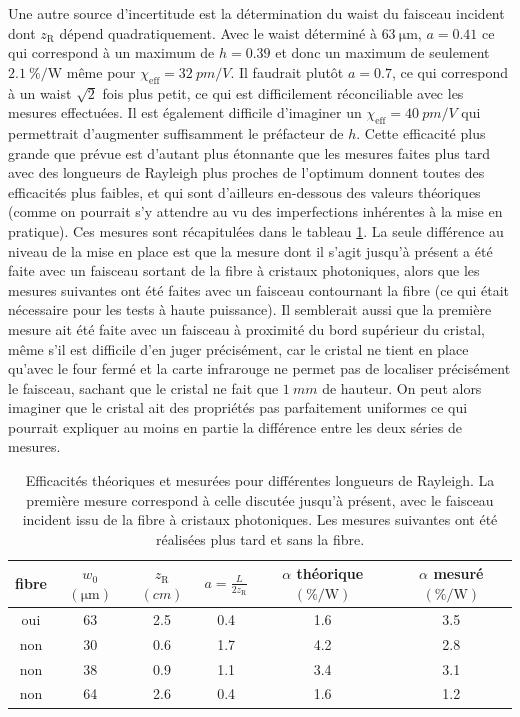 \documentclass[11pt,a4paper]{article}
\newcommand{\ra}[1]{\renewcommand{\arraystretch}{#1}}
\newcommand{\zr}{z_\mathsc{R}}
\newcommand{\chie}{\chi_\mathsc{eff}}
\newcommand{\alphae}[1]{\SI{#1}{\percent\per\watt}}
\newcommand{\mathsc}[1]{\mathrm{\scriptscriptstyle {#1}}}
\begin{document}
Une autre source d'incertitude est la détermination du waist du faisceau incident dont $\zr$ dépend quadratiquement. Avec le waist déterminé à $\SI{63}{\micro\meter}$, $a=0.41$ ce qui correspond à un maximum de $h = 0.39$ et donc un maximum de seulement $\alphae{2.1}$ même pour $\chie = \SI{32}{pm/V}$. Il faudrait plutôt $a=0.7$, ce qui correspond à un waist $\sqrt2$ fois plus petit, ce qui est difficilement réconciliable avec les mesures effectuées. %
Il est également difficile d'imaginer un $\chie=\SI{40}{pm/V}$ qui permettrait d'augmenter suffisamment le préfacteur de $h$. Cette efficacité plus grande que prévue est d'autant plus étonnante que les mesures faites plus tard avec des longueurs de Rayleigh plus proches de l'optimum donnent toutes des efficacités plus faibles, et qui sont d'ailleurs en-dessous des valeurs théoriques (comme on pourrait s'y attendre au vu des imperfections inhérentes à la mise en pratique). Ces mesures sont récapitulées dans le tableau \ref{table:bp}. La seule différence au niveau de la mise en place est que la mesure dont il s'agit jusqu'à présent a été faite avec un faisceau sortant de la fibre à cristaux photoniques, alors que les mesures suivantes ont été faites avec un faisceau contournant la fibre (ce qui était nécessaire pour les tests à haute puissance). Il semblerait aussi que la première mesure ait été faite avec un faisceau à proximité du bord supérieur du cristal, même s'il est difficile d'en juger précisément, car le cristal ne tient en place qu'avec le four fermé et la carte infrarouge ne permet pas de localiser précisément le faisceau, sachant que le cristal ne fait que $\SI{1}{mm}$ de hauteur. On peut alors imaginer que le cristal ait des propriétés pas parfaitement uniformes ce qui pourrait expliquer au moins en partie la différence entre les deux séries de mesures.

\begin{table}[h]\centering
\ra{1.3}
\begin{tabular}{@{}cccccc@{}}\toprule
	fibre & $w_0$ $(\unit{\micro\meter})$ & $\zr$ $(\unit{cm})$ & $a=\frac L {2\zr}$ & $\alpha$ théorique $(\unit{\percent\per\watt})$ & $\alpha$ mesuré $(\unit{\percent\per\watt})$ \\ \midrule
	oui & 63     & 2.5 & 0.4 & 1.6 & 3.5 \\ \midrule  
	non & 30    & 0.6 & 1.7 & 4.2                & 2.8             \\
	non & 38    & 0.9 & 1.1 & 3.4                & 3.1             \\
	non & 64    & 2.6 & 0.4 & 1.6                & 1.2             \\ \bottomrule
\end{tabular}
\caption{Efficacités théoriques et mesurées pour différentes longueurs de Rayleigh. \small La première mesure correspond à celle discutée jusqu'à présent, avec le faisceau incident issu de la fibre à cristaux photoniques. Les mesures suivantes ont été réalisées plus tard et sans la fibre.}
\label{table:bp}
\end{table}
\end{document}
